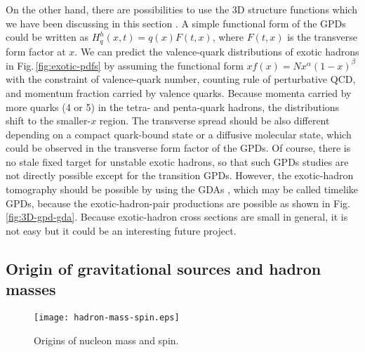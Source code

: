 \documentclass{PoS}
\begin{document}
On the other hand, there are possibilities to use the 3D structure
functions which we have been discussing in this section \cite{kk-2014}.
A simple functional form of the GPDs could be written as
$H_q^h (x,t) = q(x) F(t,x)$, where $F(t,x)$ is the transverse
form factor at $x$. We can predict the valence-quark distributions
of exotic hadrons in Fig.\,\ref{fig:exotic-pdfs}
by assuming the functional form $x f(x) = N x^\alpha (1-x)^\beta$ 
with the constraint of valence-quark number, 
counting rule of perturbative QCD,
and momentum fraction carried by valence quarks.
Because momenta carried by more quarks (4 or 5)
in the tetra- and penta-quark hadrons, the distributions
shift to the smaller-$x$ region. The transverse spread should be
also different depending on a compact quark-bound state or 
a diffusive molecular state, which could be observed
in the transverse form factor of the GPDs.
Of course, there is no stale fixed target for unstable exotic
hadrons, so that such GPDs studies are not directly possible
except for the transition GPDs.
However, the exotic-hadron tomography should be possible
by using the GDAs \cite{kk-2014}, which may be called timelike GPDs, 
because the exotic-hadron-pair productions are possible as shown
in Fig.\,\ref{fig:3D-gpd-gda}.
Because exotic-hadron cross sections are small in general,
it is not easy but it could be an interesting future project.

\subsection{Origin of gravitational sources and hadron masses}
\label{mass}

\begin{wrapfigure}[12]{r}{0.55\textwidth}
    \hspace{-0.40cm}
\begin{minipage}[c]{0.50\textwidth}
    \vspace{-0.30cm}
   \begin{center}
    \texttt{[image: hadron-mass-spin.eps]}
   \end{center}
\vspace{-0.80cm}
\caption{Origins of nucleon mass and spin.}
\label{fig:hadron-mass-spin}
\vspace{-0.4cm}   
\end{minipage}
\end{wrapfigure}
\end{document}
